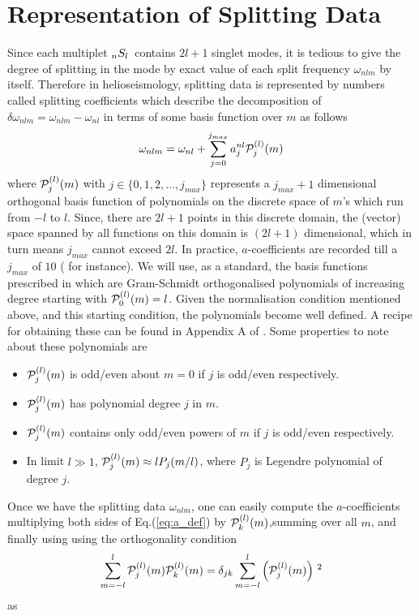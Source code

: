 \section{Representation of Splitting Data}
Since each multiplet $_{n}S_{l}\,$ contains $2l+1$ singlet modes, it is tedious to give the degree of splitting in the mode by exact value of each split frequency $\omega_{nlm}$ by itself. Therefore in helioseismology, splitting data is represented by numbers called splitting coefficients which describe the decomposition of $\delta\omega_{nlm} = \omega_{nlm}-\omega_{nl}$ in terms of some basis function over $m$ as follows
\begin{equation}
\omega_{nlm} = \omega_{nl} + \sum_{j=0}^{j_{max}} a^{nl}_j \mathcal{P}^{(l)}_j(m)
\label{eq:a_def}
\end{equation}
where $\mathcal{P}^{(l)}_{j}(m)$ with $j\in \{0,1,2,\ldots, j_{max}\}$ represents a $j_{max}+1$ dimensional orthogonal basis function of polynomials on the discrete space of $m$'s which run from $-l$ to $l$. Since, there are $2l+1$ points in this discrete domain, the (vector) space spanned by all functions on this domain is $(2l+1)$ dimensional, which in turn means $j_{max}$ cannot exceed $2l$. In practice, $a$-coefficients are recorded till a $j_{max}$ of $10$ (\cite{schou_data} for instance). We will use, as a standard, the basis functions prescribed in \cite{ritzwoller} which are Gram-Schmidt orthogonalised polynomials of increasing degree starting with $\mathcal{P}^{(l)}_0(m) = l$. Given the normalisation condition mentioned above, and this starting condition, the polynomials become well defined. A recipe for obtaining these can be found in Appendix A of \cite{schou_pol_94}. Some properties to note about these polynomials are
\begin{itemize}
\item $\mathcal{P}^{(l)}_j(m)$ is odd/even about $m=0$ if $j$ is odd/even respectively.
\item $\mathcal{P}^{(l)}_j(m)$ has polynomial degree $j$ in $m$.
\item $\mathcal{P}^{(l)}_j(m)$ contains only odd/even powers of $m$ if $j$ is odd/even respectively.
\item In limit $l \gg 1$, $\mathcal{P}^{(l)}_j(m) \approx lP_{j}(m/l)$, where $P_j$ is Legendre polynomial of degree $j$.
\end{itemize}

Once we have the splitting data $\omega_{nlm}$, one can easily compute the $a$-coefficients multiplying both sides of Eq.(\ref{eq:a_def}) by $\mathcal{P}^{(l)}_k(m)$,summing over all $m$, and finally using using the orthogonality condition $$\sum_{m=-l}^l \mathcal{P}^{(l)}_{j}(m) \mathcal{P}^{(l)}_{k}(m) = \delta_{jk} \sum_{m=-l}^l \left( \mathcal{P}^{(l)}_{j}(m) \right)\,^2$$
as

